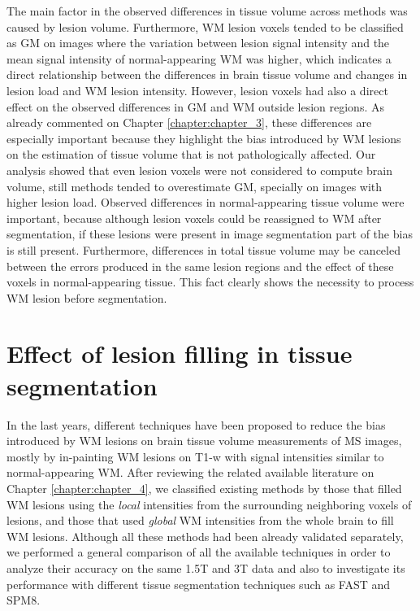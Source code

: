 The main factor in the observed differences in tissue volume across methods was caused by lesion volume. Furthermore, WM lesion voxels tended to be classified as GM on images where the variation between lesion signal intensity and the mean signal intensity of normal-appearing WM was higher, which indicates a direct relationship between the differences in brain tissue volume and changes in lesion load and WM lesion intensity. However, lesion voxels had also a direct effect on the observed differences in GM and WM outside lesion regions. As already commented on Chapter \ref{chapter:chapter_3}, these differences are especially important because they highlight the bias introduced by WM lesions on the estimation of tissue volume that is not pathologically affected. Our analysis showed that even lesion voxels were not considered to compute brain volume, still methods tended to overestimate GM, specially on images with higher lesion load. Observed differences in normal-appearing tissue volume were important, because although lesion voxels could be reassigned to WM after segmentation, if these lesions were present in image segmentation part of the bias is still present. Furthermore, differences in total tissue volume may be canceled between the errors produced in the same lesion regions and the effect of these voxels in normal-appearing tissue. This fact clearly shows the necessity to process WM lesion before segmentation.


\section{Effect of lesion filling in tissue segmentation}

In the last years, different techniques have been proposed to reduce the bias introduced by WM lesions on brain tissue volume measurements of MS images, mostly by in-painting WM lesions on T1-w with signal intensities similar to normal-appearing WM.  After reviewing the related available literature on Chapter \ref{chapter:chapter_4}, we classified existing methods by those that filled WM lesions using the \textit{local} intensities from the surrounding neighboring voxels of lesions, and those that used \textit{global} WM intensities from the whole brain to fill WM lesions. Although all these methods had been already validated separately, we performed a general comparison of all the available techniques in order to analyze their accuracy on the same 1.5T and 3T data and also to investigate its performance with different tissue segmentation techniques such as FAST and SPM8.

